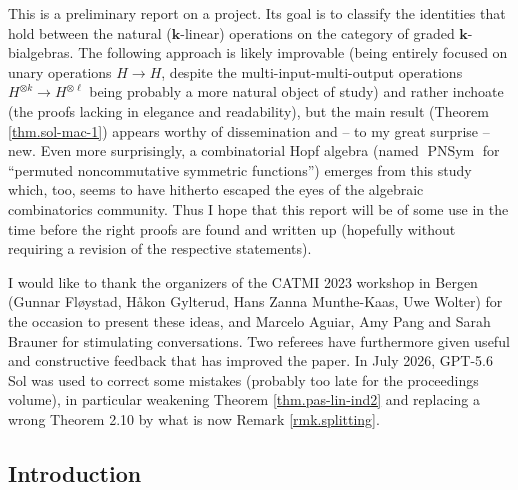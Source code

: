 \documentclass[numbers=enddot,12pt,final,onecolumn,notitlepage]{scrartcl}%
\theoremstyle{definition}
\begin{document}
This is a preliminary report on a project. Its goal is to classify the
identities that hold between the natural ($\mathbf{k}$-linear) operations on
the category of graded $\mathbf{k}$-bialgebras. The following approach is
likely improvable (being entirely focused on unary operations $H\rightarrow
H$, despite the multi-input-multi-output operations $H^{\otimes k}\rightarrow
H^{\otimes\ell}$ being probably a more natural object of study) and rather
inchoate (the proofs lacking in elegance and readability), but the main result
(Theorem \ref{thm.sol-mac-1}) appears worthy of dissemination and -- to my
great surprise -- new. Even more surprisingly, a combinatorial Hopf algebra
(named $\operatorname*{PNSym}$ for \textquotedblleft permuted noncommutative
symmetric functions\textquotedblright) emerges from this study which, too,
seems to have hitherto escaped the eyes of the algebraic combinatorics
community. Thus I hope that this report will be of some use in the time before
the right proofs are found and written up (hopefully without requiring a
revision of the respective statements).

I would like to thank the organizers of the CATMI 2023 workshop in Bergen
(Gunnar Fl\o ystad, H\aa kon Gylterud, Hans Zanna Munthe-Kaas, Uwe Wolter) for
the occasion to present these ideas, and Marcelo Aguiar, Amy Pang and Sarah
Brauner for stimulating conversations. Two referees have furthermore given
useful and constructive feedback that has improved the paper. In July 2026,
GPT-5.6 Sol was used to correct some mistakes (probably too late for the
proceedings volume), in particular weakening Theorem \ref{thm.pas-lin-ind2}
and replacing a wrong Theorem 2.10 by what is now Remark \ref{rmk.splitting}.

\subsection{Introduction}
\end{document}
